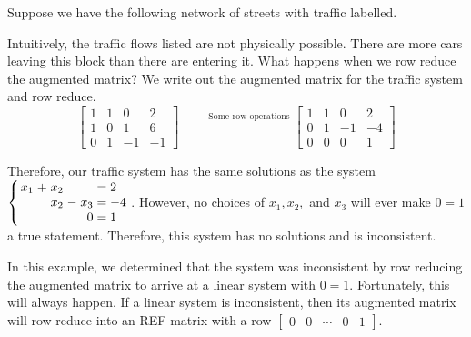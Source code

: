 \begin{example}\label{ex:inconsistent}

	Suppose we have the following network of streets with traffic labelled.
	\begin{center}
		\end{center}
		
	Intuitively, the traffic flows listed are not physically possible. There are more cars leaving this block than there are entering it. What happens when we row reduce the augmented matrix? We write out the augmented matrix for the traffic system and row reduce.
	\[
		\begin{bmatrix}
			1 & 1 & 0 & 2\\
			1 & 0 & 1 & 6\\
			0 & 1 & -1 & -1
		\end{bmatrix}
		\qquad \xrightarrow{\text{Some row operations}} 
		\begin{bmatrix}
			1 & 1 & 0 & 2\\
			0 & 1 & -1 & -4\\
			0 & 0 & 0 & 1
		\end{bmatrix}
	\]
	
	Therefore, our traffic system has the same solutions as the system 
	$\left\{
		\arraycolsep=1.4pt
		\begin{array}{rcrcrl} 
			x_1  &+ & x_2 & & & = 2\\  
			& & x_2 & - & x_3 & = -4\\
			& & & & 0 & = 1
		\end{array}
	\right.$.
	However, no choices of $x_1, x_2,$ and $x_3$ will ever make $0 = 1$ a true statement. Therefore, this system has no solutions and is inconsistent.
\end{example}

In this example, we determined that the system was inconsistent by row reducing the augmented matrix to arrive at a linear system with $0 = 1$. Fortunately, this will always happen. If a linear system is inconsistent, then its augmented matrix will row reduce into an REF matrix with a row $\begin{bmatrix} 0 & 0 & \cdots & 0 & 1\end{bmatrix}.$
